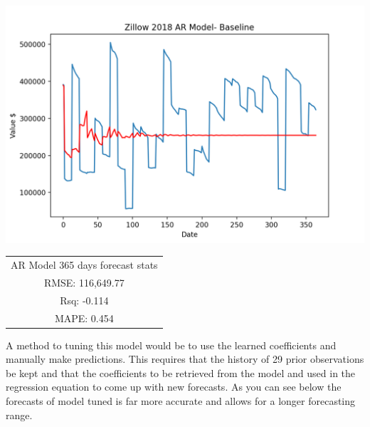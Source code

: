 \documentclass{article}
\begin{document}
	\includegraphics[scale = 0.2]{../plots/2018/zillow2018_AR-model-base365.png}
	\begin{center}
    \begin{tabular}{ c }
     AR Model 365 days forecast stats \\ 
     RMSE: 116,649.77 \\  
     Rsq: -0.114 \\
     MAPE: 0.454 \\
    \end{tabular}
    \end{center} 
	
	A method to tuning this model would be to use the learned coefficients and manually make predictions. This requires that the history of 29 prior observations be kept and that the coefficients to be retrieved from the model and used in the regression equation to come up with new forecasts. As you can see below the forecasts of model tuned is far more accurate and allows for a longer forecasting range. \\
\end{document}
